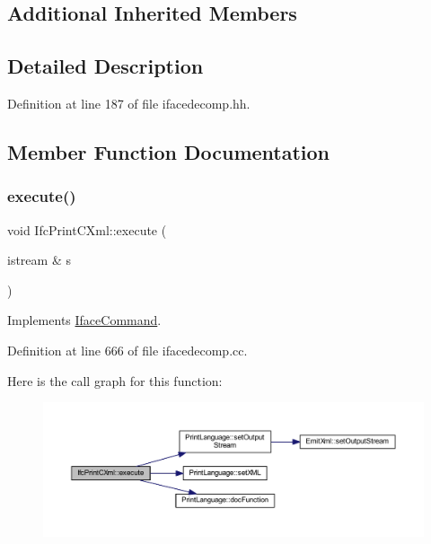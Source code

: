 \subsection*{Additional Inherited Members}


\subsection{Detailed Description}


Definition at line 187 of file ifacedecomp.\+hh.



\subsection{Member Function Documentation}
\mbox{\label{class_ifc_print_c_xml_aee74cbfcd8d9415aaf178283a32f34b9}} 
\subsubsection{\texorpdfstring{execute()}{execute()}}
{\footnotesize\ttfamily void Ifc\+Print\+C\+Xml\+::execute (\begin{DoxyParamCaption}\item[{istream \&}]{s }\end{DoxyParamCaption})\hspace{0.3cm}{\ttfamily [virtual]}}



Implements \mbox{\hyperlink{class_iface_command_af10e29cee2c8e419de6efe9e680ad201}{Iface\+Command}}.



Definition at line 666 of file ifacedecomp.\+cc.

Here is the call graph for this function\+:
\nopagebreak
\begin{figure}[H]
\begin{center}
\leavevmode
\includegraphics[width=350pt]{class_ifc_print_c_xml_aee74cbfcd8d9415aaf178283a32f34b9_cgraph}
\end{center}
\end{figure}


